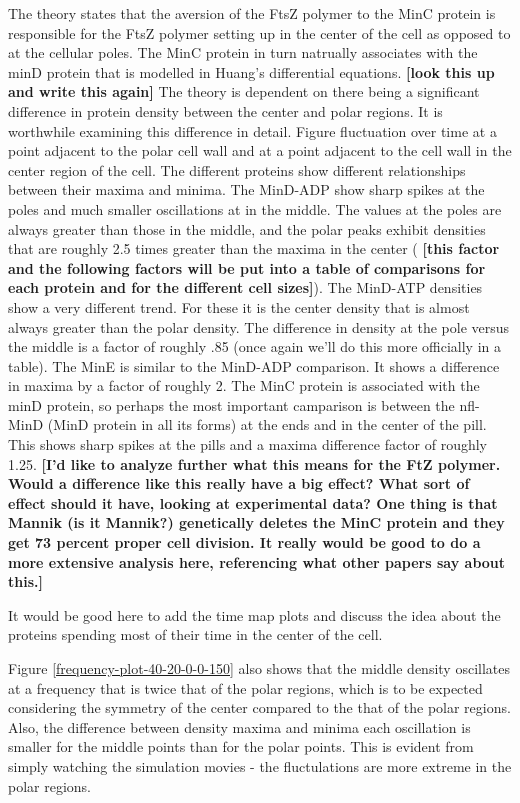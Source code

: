 \documentclass[letterpaper,twocolumn,amsmath,amssymb,pre]{revtex4-1}
\newcommand{\red}[1]{{\bf \color{red} #1}}
\newcommand{\fixme}[1]{\red{[#1]}}
\begin{document}
The theory states that the aversion of the FtsZ polymer to the MinC
protein is responsible for the FtsZ polymer setting up in the center
of the cell as opposed to at the cellular poles.  The MinC protein in
turn natrually associates with the minD protein that is modelled in
Huang's differential equations.  \fixme{look this up and write this
  again} The theory is dependent on there being a significant
difference in protein density between the center and polar regions. It
is worthwhile examining this difference in detail.  Figure
fluctuation over time at a point adjacent to the polar cell wall and
at a point adjacent to the cell wall in the center region of the cell.
The different proteins show different relationships between their
maxima and minima.  The MinD-ADP show sharp spikes at the poles and
much smaller oscillations at in the middle.  The values at the poles
are always greater than those in the middle, and the polar peaks
exhibit densities that are roughly 2.5 times greater than the maxima
in the center (\fixme{this factor and the following factors will be put
  into a table of comparisons for each protein and for the different
  cell sizes}).  The MinD-ATP densities show a very different trend.
For these it is the center density that is almost always greater than
the polar density.  The difference in density at the pole versus the
middle is a factor of roughly .85 (once again we'll do this more
officially in a table).  The MinE is similar to the MinD-ADP
comparison.  It shows a difference in maxima by a factor of roughly 2.
The MinC protein is associated with the minD protein, so perhaps the
most important camparison is between the nfl-MinD (MinD protein in all
its forms) at the ends and in the center of the pill.  This shows
sharp spikes at the pills and a maxima difference factor of roughly
1.25. \fixme{I'd like to analyze further what this means for the FtZ
  polymer.  Would a difference like this really have a big effect?
  What sort of effect should it have, looking at experimental data?
  One thing is that Mannik (is it Mannik?) genetically deletes the
  MinC protein and they get 73 percent proper cell division.  It
  really would be good to do a more extensive analysis here,
  referencing what other papers say about this.}

It would be good here to add the time map plots and discuss the idea
about the proteins spending most of their time in the center of the
cell.

Figure \ref{frequency-plot-40-20-0-0-150} also shows that the middle
density oscillates at a frequency that is twice that of the polar
regions, which is to be expected considering the symmetry of the
center compared to the that of the polar regions.  Also, the
difference between density maxima and minima each oscillation is
smaller for the middle points than for the polar points.  This is
evident from simply watching the simulation movies - the fluctulations
are more extreme in the polar regions.
\end{document}
